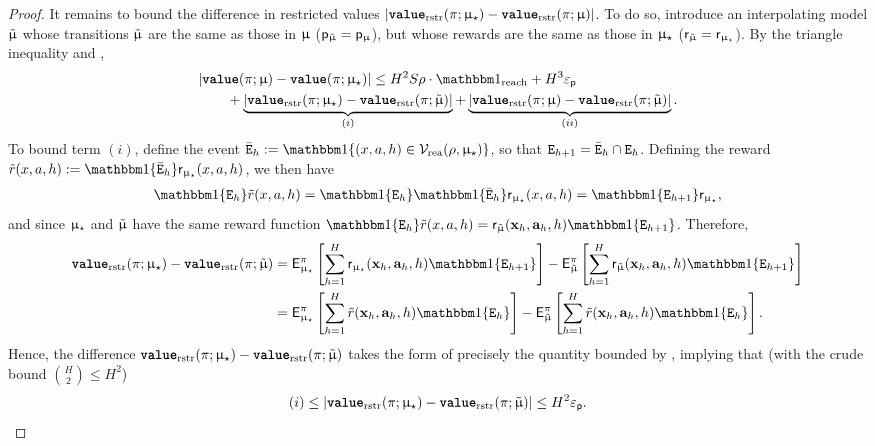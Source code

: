 \begin{proof}
It remains to bound the difference in restricted values $|{\normalfont \texttt{\textbf{value}}}_{\mathrm{rstr}}(\pi;\upmu_{\star}) - {\normalfont \texttt{\textbf{value}}}_{\mathrm{rstr}}(\pi;\upmu)|$. To do so, introduce an interpolating model $\tilde{\upmu}$ whose transitions $\tilde{\upmu}$ are the same as those in $\upmu$ ($\mathsf{p}_{\tilde{\upmu}} = \mathsf{p}_{\upmu}$), but whose rewards are the same as those in $\upmu_{\star}$ ($\mathsf{r}_{\tilde{\upmu}} = \mathsf{r}_{\upmu_{\star}}$). By the triangle inequality and ,
\begin{equation}\label{eq:pennultimate_value_bound}
\begin{aligned}
 &|\valuef{\pi}{\model}  - \valuef{\pi}{\modst}| \le  H^2 S \rho \cdot \indreach + H^3 \epsp \\
 &\qquad+ \underbrace{|\valuefrest{\pi}{\modst} - \valuefrest{\pi}{\modtil}|}_{(i)} + \underbrace{|\valuefrest{\pi}{\model} - \valuefrest{\pi}{\modtil}|}_{(ii)}.
\end{aligned}
\end{equation}
To bound term $(i)$, define the event $\bar{\scrE}_{h} := \ind\{(x,a,h) \in \Vreach(\rho,\modst)\}$, so that $\texttt{E}_{h+1} = \bar{\texttt{E}}_{h} \cap \texttt{E}_{h}$. Defining the reward $\rtil(x,a,h) := \ind\{\bar{\scrE}_h\}\sfr_{\modst}\xah$, we then have
\begin{align}
\ind\{\scrE_h\}\rtil(x,a,h) = \ind\{\scrE_h\}\ind\{\bar{\scrE}_h\}\sfr_{\modst}\xah = \ind\{\scrE_{h+1}\}\sfr_{\modst},
\end{align}
and since $\upmu_{\star}$ and $\tilde{\upmu}$ have the same reward function $\ind\{\scrE_h\}\rtil(x,a,h)= \sfr_{\modtil}(\bmx_h,\bma_h,h) \ind\{\scrE_{h+1}\}$. Therefore,
\begin{align*}
\valuefrest{\pi}{\modst} - \valuefrest{\pi}{\modtil} &= \sfE^{\pi}_{\modst}\left[\sum_{h=1}^H \sfr_{\modst}(\bmx_h,\bma_h,h) \ind\{\scrE_{h+1}\}\right] - \sfE^{\pi}_{\modtil}\left[\sum_{h=1}^H \sfr_{\modtil}(\bmx_h,\bma_h,h) \ind\{\scrE_{h+1}\}\right]\\
 &= \sfE^{\pi}_{\modst}\left[\sum_{h=1}^H \rtil(\bmx_h,\bma_h,h) \ind\{\scrE_{h}\}\right] - \sfE^{\pi}_{\modtil}\left[\sum_{h=1}^H \rtil(\bmx_h,\bma_h,h) \ind\{\scrE_{h}\}\right].
\end{align*}
Hence, the difference ${\normalfont \texttt{\textbf{value}}}_{\mathrm{rstr}}(\pi;\upmu_{\star}) - {\normalfont \texttt{\textbf{value}}}_{\mathrm{rstr}}(\pi;\tilde{\upmu})$ takes the form of precisely the quantity bounded by , implying that (with the crude bound $\binom{H}{2} \le H^2$)
\begin{align}
(i) \le |{\normalfont \texttt{\textbf{value}}}_{\mathrm{rstr}}(\pi;\upmu_{\star}) - {\normalfont \texttt{\textbf{value}}}_{\mathrm{rstr}}(\pi;\tilde{\upmu})| \le H^2 \varepsilon_{\mathsf{p}}.
\end{align}

\end{proof}
